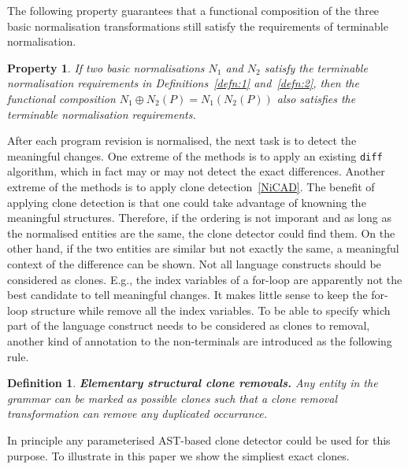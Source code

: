 \documentclass[10pt, conference, compsocconf]{IEEEtran}
\newtheorem{property}{Property}
\newtheorem{definition}{Definition}
\begin{document}
The following property guarantees that a functional composition of the three basic normalisation transformations still satisfy the requirements of terminable normalisation.
\begin{property}
If two basic normalisations $N_1$ and $N_2$ satisfy the terminable normalisation requirements in Definitions~\ref{defn:1} and~\ref{defn:2}, then the functional composition $N_1 \oplus N_2 (P) = N_1 (N_2(P))$ also satisfies the terminable normalisation requirements.
\end{property}

After each program revision is normalised, the next task is to detect the meaningful changes. One extreme of  the methods is to apply an existing {\tt diff} algorithm, which in fact may or may not detect the exact differences.  Another extreme of the methods is to apply clone detection~\ref{NiCAD}. The benefit of applying clone detection is that one could take advantage of knowning the meaningful structures. Therefore, if the ordering is not imporant and as long as the normalised entities are the same, the clone detector could find them. On  the other hand, if the two entities are similar but not exactly the same, a meaningful context of the difference can be shown.
Not all language constructs should be considered as clones. E.g., the index variables of a for-loop are apparently not the best candidate to tell meaningful changes. It makes little sense to keep the for-loop structure while remove all the index variables.
To be able to specify which part of the language construct needs to be considered as clones to removal, another kind of annotation to the non-terminals are introduced as the following rule. 

\begin{definition}
{\bf Elementary structural clone removals.\label{defn:norm5}} Any entity in the grammar can be marked as possible clones such that a clone removal transformation can remove any duplicated occurrance. 
\end{definition}

In principle any parameterised AST-based clone detector could be used for this purpose. To illustrate in this paper we show the simpliest exact clones.
\end{document}

